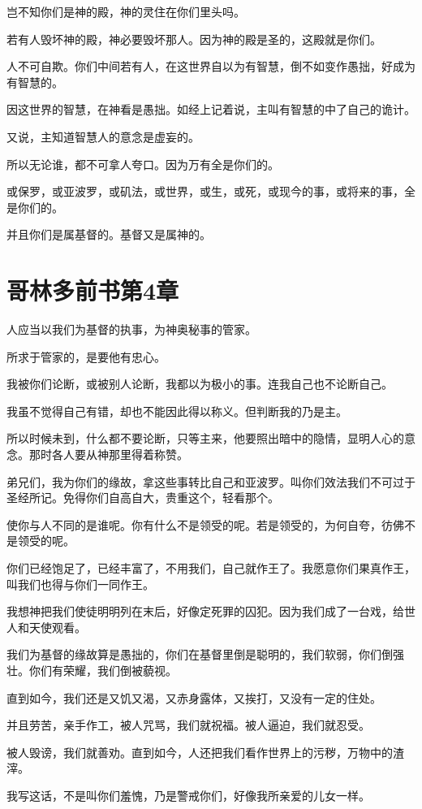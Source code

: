 \documentclass[12pt,oneside]{book}
\begin{document}
岂不知你们是神的殿，神的灵住在你们里头吗。

若有人毁坏神的殿，神必要毁坏那人。因为神的殿是圣的，这殿就是你们。

人不可自欺。你们中间若有人，在这世界自以为有智慧，倒不如变作愚拙，好成为有智慧的。

因这世界的智慧，在神看是愚拙。如经上记着说，主叫有智慧的中了自己的诡计。

又说，主知道智慧人的意念是虚妄的。

所以无论谁，都不可拿人夸口。因为万有全是你们的。

或保罗，或亚波罗，或矶法，或世界，或生，或死，或现今的事，或将来的事，全是你们的。

并且你们是属基督的。基督又是属神的。

\chapter{哥林多前书第4章}
人应当以我们为基督的执事，为神奥秘事的管家。

所求于管家的，是要他有忠心。

我被你们论断，或被别人论断，我都以为极小的事。连我自己也不论断自己。

我虽不觉得自己有错，却也不能因此得以称义。但判断我的乃是主。

所以时候未到，什么都不要论断，只等主来，他要照出暗中的隐情，显明人心的意念。那时各人要从神那里得着称赞。

弟兄们，我为你们的缘故，拿这些事转比自己和亚波罗。叫你们效法我们不可过于圣经所记。免得你们自高自大，贵重这个，轻看那个。

使你与人不同的是谁呢。你有什么不是领受的呢。若是领受的，为何自夸，彷佛不是领受的呢。

你们已经饱足了，已经丰富了，不用我们，自己就作王了。我愿意你们果真作王，叫我们也得与你们一同作王。

我想神把我们使徒明明列在末后，好像定死罪的囚犯。因为我们成了一台戏，给世人和天使观看。

我们为基督的缘故算是愚拙的，你们在基督里倒是聪明的，我们软弱，你们倒强壮。你们有荣耀，我们倒被藐视。

直到如今，我们还是又饥又渴，又赤身露体，又挨打，又没有一定的住处。

并且劳苦，亲手作工，被人咒骂，我们就祝福。被人逼迫，我们就忍受。

被人毁谤，我们就善劝。直到如今，人还把我们看作世界上的污秽，万物中的渣滓。

我写这话，不是叫你们羞愧，乃是警戒你们，好像我所亲爱的儿女一样。
\end{document}
